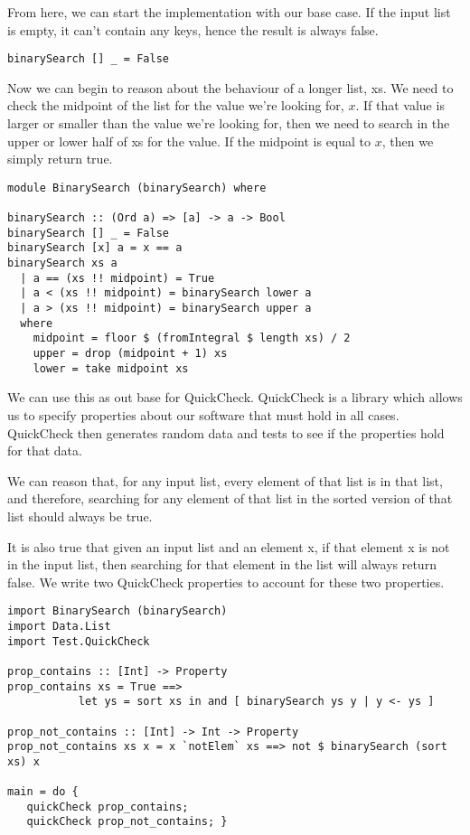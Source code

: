 \documentclass{article}
\begin{document}
From here, we can start the implementation with our base case. If the input list is empty, it can't contain any keys, hence the result is always false.

\begin{lstlisting}
binarySearch [] _ = False
\end{lstlisting}

Now we can begin to reason about the behaviour of a longer list, xs. We need to check the midpoint of the list for the value we're looking for, $x$. If that value is larger or smaller than the value we're looking for, then we need to search in the upper or lower half of xs for the value. If the midpoint is equal to $x$, then we simply return true.

\begin{lstlisting}
module BinarySearch (binarySearch) where

binarySearch :: (Ord a) => [a] -> a -> Bool
binarySearch [] _ = False
binarySearch [x] a = x == a
binarySearch xs a
  | a == (xs !! midpoint) = True
  | a < (xs !! midpoint) = binarySearch lower a
  | a > (xs !! midpoint) = binarySearch upper a
  where
    midpoint = floor $ (fromIntegral $ length xs) / 2
    upper = drop (midpoint + 1) xs
    lower = take midpoint xs
\end{lstlisting}

We can use this as out base for QuickCheck. QuickCheck is a library which allows us to specify properties about our software that must hold in all cases. QuickCheck then generates random data and tests to see if the properties hold for that data.

We can reason that, for any input list, every element of that list is in that list, and therefore, searching for any element of that list in the sorted version of that list should always be true.

It is also true that given an input list and an element x, if that element x is not in the input list, then searching for that element in the list will always return false. We write two QuickCheck properties to account for these two properties.
 
\begin{lstlisting}
import BinarySearch (binarySearch)
import Data.List
import Test.QuickCheck

prop_contains :: [Int] -> Property
prop_contains xs = True ==> 
           let ys = sort xs in and [ binarySearch ys y | y <- ys ]

prop_not_contains :: [Int] -> Int -> Property
prop_not_contains xs x = x `notElem` xs ==> not $ binarySearch (sort xs) x

main = do {
   quickCheck prop_contains;
   quickCheck prop_not_contains; }
\end{lstlisting} 
\end{document}
